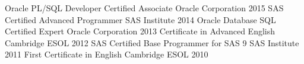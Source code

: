 \begin{cvhonors}
  \cvhonor
    {Oracle PL/SQL Developer Certified Associate}
    {Oracle Corporation}
    {}
    {2015}
  \cvhonor
    {SAS Certified Advanced Programmer}
    {SAS Institute}
    {}
    {2014}
  \cvhonor
    {Oracle Database SQL Certified Expert}
    {Oracle Corporation}
    {}
    {2013}
  \cvhonor
    {Certificate in Advanced English}
    {Cambridge ESOL}
    {}
    {2012}
  \cvhonor
    {SAS Certified Base Programmer for SAS 9}
    {SAS Institute}
    {}
    {2011}
  \cvhonor
    {First Certificate in English}
    {Cambridge ESOL}
    {}
    {2010}
\end{cvhonors}
